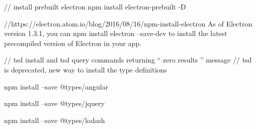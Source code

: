 // install prebuilt electron
npm install electron-prebuilt -D

//https://electron.atom.io/blog/2016/08/16/npm-install-electron
As of Electron version 1.3.1, you can npm install electron --save-dev to install the latest precompiled version of Electron in your app.

// tsd install and tsd query commands returning “ zero results ” message
// tsd is deprecated, new way to install the type definitions

npm install --save @types/angular

npm install --save @types/jquery

npm install --save @types/lodash
